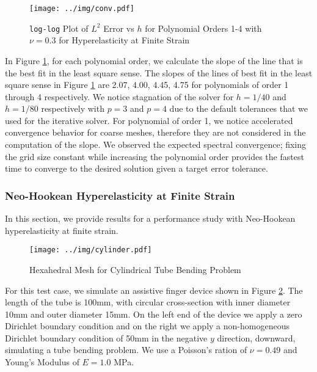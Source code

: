 \begin{figure}[hbt!]
 \begin{center}
      \texttt{[image: ../img/conv.pdf]}
\end{center}
\caption{\texttt{log-log} Plot of $L^2$ Error vs $h$ for Polynomial Orders 1-4 with $\nu = 0.3$ for Hyperelasticity at Finite Strain}
    \label{fig:lin-elas-conv}
\end{figure}

In Figure \ref{fig:lin-elas-conv}, for each polynomial order, we calculate the slope of the line that is the best fit in the least square sense.
The slopes of the lines of best fit in the least square sense in Figure \ref{fig:lin-elas-conv} are 2.07, 4.00, 4.45, 4.75 for polynomials of order 1 through 4 respectively.
We notice stagnation of the solver for $h = 1/40$ and $h = 1/80$ respectively with $p = 3$ and $p = 4$ due to the default tolerances that we used for the iterative solver.
For polynomial of order 1, we notice accelerated convergence behavior for coarse meshes, therefore they are not considered in the computation of the slope.
We observed the expected spectral convergence; fixing the grid size constant while increasing the polynomial order provides the fastest time to converge to the desired solution given a target error tolerance.

\subsubsection{Neo-Hookean Hyperelasticity at Finite Strain}

In this section, we provide results for a performance study with Neo-Hookean hyperelasticity at finite strain.

\begin{figure}[ht!]
 \begin{center}
      \texttt{[image: ../img/cylinder.pdf]}
\end{center}
\caption{Hexahedral Mesh for Cylindrical Tube Bending Problem}
    \label{fig:hyper-cylinder}
\end{figure}

For this test case, we simulate an assistive finger device shown in Figure \ref{fig:hyper-cylinder}.
The length of the tube is 100mm, with circular cross-section with inner diameter 10mm and outer diameter 15mm.
On the left end of the device we apply a zero Dirichlet boundary condition and on the right we apply a non-homogeneous Dirichlet boundary condition of 50mm in the negative $y$ direction, downward, simulating a tube bending problem.
We use a Poisson's ration of $\nu = 0.49$ and Young's Modulus of $E = 1.0$ MPa.

